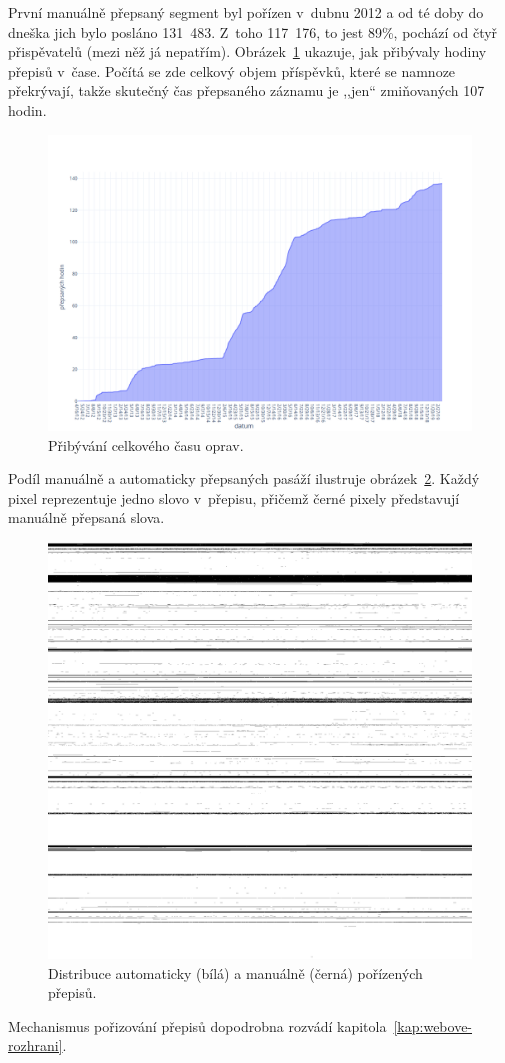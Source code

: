 První manuálně přepsaný segment byl pořízen v~dubnu 2012 a od té doby do dneška
jich bylo posláno 131~483. Z~toho 117~176, to jest 89\%, pochází od čtyř
přispěvatelů (mezi něž já nepatřím).
Obrázek~\ref{fig:corpus-growth} ukazuje, jak přibývaly hodiny přepisů v~čase.
Počítá se zde celkový objem příspěvků, které se namnoze překrývají, takže
skutečný čas přepsaného záznamu je ,,jen`` zmiňovaných 107 hodin.

\begin{figure}[htpb]
\includegraphics[scale=0.36]{rc/corpus-growth.png}
\caption{Přibývání celkového času oprav.}
\label{fig:corpus-growth}
\end{figure}

Podíl manuálně a automaticky přepsaných pasáží ilustruje
obrázek~\ref{fig:humbits}. Každý pixel reprezentuje jedno slovo v~přepisu,
přičemž černé pixely představují manuálně přepsaná slova.

\begin{figure}[htpb]
\includegraphics[scale=0.137]{rc/humbits.png}
\caption{Distribuce automaticky (bílá) a manuálně (černá) pořízených přepisů.}
\label{fig:humbits}
\end{figure}

Mechanismus pořizování přepisů dopodrobna rozvádí kapitola~\ref{kap:webove-rozhrani}. 
